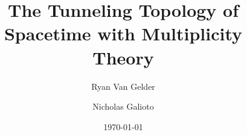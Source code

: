 \documentclass{article}
\title{The Tunneling Topology of Spacetime with Multiplicity Theory}
\author[1]{Ryan Van Gelder}
\author[2]{Nicholas Galioto}
\affil{Citizen Gardens - The Foundation of Multiplicity\\info@citizengardens.org}
\date{\today}
\theoremstyle{plain}
\begin{document}
\maketitle

\begin{abstract}

\end{abstract}




\nocite{*}


\end{document}

